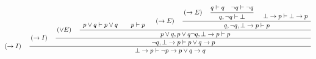 \documentclass{standalone}
\begin{document}
$
\left(\rightarrow{}I\right)\quad
\cfrac{
  \left(\rightarrow{}I\right)\quad
  \cfrac{
    \left(\lor{}E\right)\quad
    \cfrac{
      \begin{array}{c}\\p\lor{}q\vdash{}p\lor{}q\end{array}
      \quad
      \begin{array}{c}\\p\vdash{}p\end{array}
      \quad
      \left(\rightarrow{}E\right)\quad
      \cfrac{
        \left(\rightarrow{}E\right)\quad
        \cfrac{
          q\vdash{}q\quad\lnot{}q\vdash\lnot{}q
        }{
          q,\lnot{}q\vdash\bot
        }
        \quad
        \begin{array}{c}\\\bot\rightarrow{}p\vdash\bot\rightarrow{}p\end{array}
      }{
        q,\lnot{}q,\bot\rightarrow{}p\vdash{}p
      }
    }{
      p\lor{}q,p\lor{}q\lnot{}q,\bot\rightarrow{}p\vdash{}p
    }
  }{
    \lnot{}q,\bot\rightarrow{}p\vdash{}p\lor{}q\rightarrow{}p
  }
}{
  \bot\rightarrow{}p\vdash{}\lnot{}p\rightarrow{}p\lor{}q\rightarrow{}q
}
$
\end{document}

